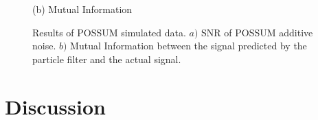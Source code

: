 \documentclass{article}
\begin{document}
\begin{figure}[htb]
\begin{minipage}[b]{.49\linewidth}
  \centerline{(b) Mutual Information}\medskip
\end{minipage}
\caption{Results of POSSUM simulated data. $a)$ 
SNR of POSSUM additive noise. $b)$ Mutual Information between
the signal predicted by the particle filter and the actual signal.}
\label{fig:PossumResult}
\end{figure}

\section{Discussion}
\label{sec:Conclusion}



\end{document}
